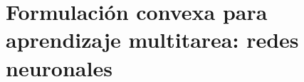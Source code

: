\documentclass[aspectratio=43,spanish]{beamer}
\newcommand{\fmaxn}[1]{\textbf{#1}}
\newcommand{\fmod}[1]{\textsf{#1}}
\begin{document}
  

  


  \section{Formulación convexa para aprendizaje multitarea: redes neuronales}
\end{document}
